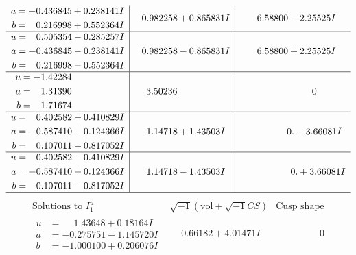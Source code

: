 \documentclass[1p]{elsarticle_modified}
\theoremstyle{definition}
\newcommand{\I}{\sqrt{-1}}
\begin{document}
$$\begin{array}{c|c|c}
\begin{aligned}
a &= -0.436845 + 0.238141 I \\
b &= \phantom{-}0.216998 + 0.552364 I\end{aligned}
 & \phantom{-}0.982258 + 0.865831 I & \phantom{-}6.58800 - 2.25525 I \\ \hline\begin{aligned}
u &= \phantom{-}0.505354 - 0.285257 I \\
a &= -0.436845 - 0.238141 I \\
b &= \phantom{-}0.216998 - 0.552364 I\end{aligned}
 & \phantom{-}0.982258 - 0.865831 I & \phantom{-}6.58800 + 2.25525 I \\ \hline\begin{aligned}
u &= -1.42284\phantom{ +0.000000I} \\
a &= \phantom{-}1.31390\phantom{ +0.000000I} \\
b &= \phantom{-}1.71674\phantom{ +0.000000I}\end{aligned}
 & \phantom{-}3.50236\phantom{ +0.000000I} & \phantom{-0.000000 } 0 \\ \hline\begin{aligned}
u &= \phantom{-}0.402582 + 0.410829 I \\
a &= -0.587410 - 0.124366 I \\
b &= \phantom{-}0.107011 + 0.817052 I\end{aligned}
 & \phantom{-}1.14718 + 1.43503 I & \phantom{-0.000000 } 0. - 3.66081 I \\ \hline\begin{aligned}
u &= \phantom{-}0.402582 - 0.410829 I \\
a &= -0.587410 + 0.124366 I \\
b &= \phantom{-}0.107011 - 0.817052 I\end{aligned}
 & \phantom{-}1.14718 - 1.43503 I & \phantom{-0.000000 -}0. + 3.66081 I\\
 \hline 
 \end{array}$$\newpage$$\begin{array}{c|c|c}  
\text{Solutions to }I^u_{1}& \I (\text{vol} + \sqrt{-1}CS) & \text{Cusp shape}\\
 \hline 
\begin{aligned}
u &= \phantom{-}1.43648 + 0.18164 I \\
a &= -0.275751 - 1.145720 I \\
b &= -1.000100 + 0.206076 I\end{aligned}
 & \phantom{-}0.66182 + 4.01471 I & \phantom{-0.000000 } 0 \\ \hline\begin{aligned}

\end{aligned}
\end{array}$$
\end{document}
